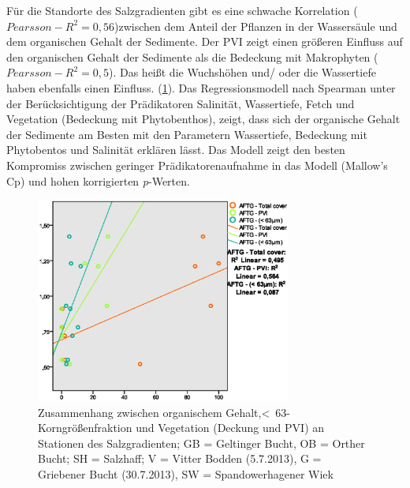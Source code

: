 Für die Standorte des Salzgradienten gibt es eine schwache Korrelation ($ Pearsson-R^2 = 0,56 $)zwischen dem Anteil der Pflanzen in der Wassersäule und dem organischen Gehalt der Sedimente. Der PVI zeigt einen größeren Einfluss auf den organischen Gehalt der Sedimente als die Bedeckung mit Makrophyten ($Pearsson-R^2 = 0,5$). Das heißt die Wuchshöhen und/ oder die Wassertiefe haben ebenfalls einen Einfluss. (\ref{fig:sg:afdg_regressionen}). 
Das Regressionsmodell nach Spearman unter der Berücksichtigung der Prädikatoren Salinität, Wassertiefe, Fetch und Vegetation (Bedeckung mit Phytobenthos), zeigt, dass sich der organische Gehalt der Sedimente am Besten mit den Parametern Wassertiefe, Bedeckung mit Phytobentos und Salinität erklären lässt. Das Modell zeigt den besten Kompromiss zwischen geringer Prädikatorenaufnahme in das Modell (Mallow's Cp) und hohen korrigierten \textit{p}-Werten.

\begin{figure}[!htb]
\centering
\includegraphics[width=0.75\textwidth]{images/salzsedimentauswertung/afdg1.eps}
\caption[Zusammenhang zwischen organischem Gehalt,\unit{<63}{\mu\metre}-Korngrößenfraktion und Vegetation]{Zusammenhang zwischen organischem Gehalt,\unit{<63}{\mu\metre}-Korngrößenfraktion und Vegetation (Deckung und PVI) an Stationen des Salzgradienten; GB = Geltinger Bucht, OB = Orther Bucht; SH = Salzhaff; V = Vitter Bodden (5.7.2013), G = Griebener Bucht (30.7.2013), SW = Spandowerhagener Wiek}
\label{fig:sg:afdg_regressionen}
\end{figure}

